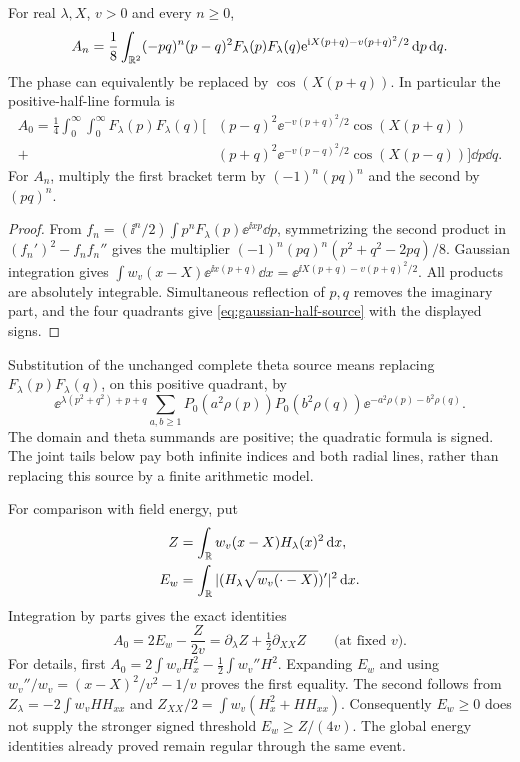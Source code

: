 \begin{proposition}\label{prop:gaussian-source}
For real \(\lambda,X\), \(v>0\) and every \(n\ge0\),
\begin{equation}\label{eq:gaussian-full-source}
 A_n=\frac18\int_{\mathbb R^2}(-pq)^n(p-q)^2F_\lambda(p)F_\lambda(q)
       \mathrm e^{\mathrm i X(p+q)-v(p+q)^2/2}\,\mathrm d p\,\mathrm d q.
\end{equation}
The phase can equivalently be replaced by \(\cos(X(p+q))\).
In particular the positive-half-line formula is
\begin{align}\label{eq:gaussian-half-source}
 A_0=\frac14\int_0^\infty\!\int_0^\infty F_\lambda(p)F_\lambda(q)
 \bigl[&(p-q)^2\ee^{-v(p+q)^2/2}\cos(X(p+q))\nonumber\\
       +&(p+q)^2\ee^{-v(p-q)^2/2}\cos(X(p-q))\bigr]\dd p\dd q.
\end{align}
For \(A_n\), multiply the first bracket term by \((-1)^n(pq)^n\)
and the second by \((pq)^n\).
\end{proposition}
\begin{proof}
From \(f_n=(\ii^n/2)\int p^nF_\lambda(p)\ee^{\ii xp}\dd p\),
symmetrizing the second product in \((f_n')^2-f_nf_n''\) gives
the multiplier \((-1)^n(pq)^n(p^2+q^2-2pq)/8\).
Gaussian integration gives
\(\int w_v(x-X)\ee^{\ii x(p+q)}\dd x
=\ee^{\ii X(p+q)-v(p+q)^2/2}\).
All products are absolutely integrable. Simultaneous reflection of
\(p,q\) removes the imaginary part, and the four quadrants give
\eqref{eq:gaussian-half-source} with the displayed signs.
\end{proof}

Substitution of the unchanged complete theta source means replacing
\(F_\lambda(p)F_\lambda(q)\), on this positive quadrant, by
\begin{equation}\label{eq:gaussian-theta-product}
 \ee^{\lambda(p^2+q^2)+p+q}
 \sum_{a,b\ge1}P_0(a^2\rho(p))P_0(b^2\rho(q))
                    \ee^{-a^2\rho(p)-b^2\rho(q)}.
\end{equation}
The domain and theta summands are positive; the quadratic formula is
signed. The joint tails below pay both infinite indices and both radial
lines, rather than replacing this source by a finite arithmetic model.

For comparison with field energy, put
\[
 \begin{aligned}
 Z&=\int_\mathbb R w_v(x-X)H_\lambda(x)^2\,\mathrm d x,\\
 E_w&=\int_\mathbb R|(H_\lambda\sqrt{w_v(\cdot-X)})'|^2\,\mathrm d x.
 \end{aligned}
\]
Integration by parts gives the exact identities
\begin{equation}\label{eq:gaussian-kinetic}
 A_0=2E_w-\frac{Z}{2v}
       =\partial_\lambda Z+\tfrac12\partial_{XX}Z
       \qquad\text{(at fixed \(v\)).}
\end{equation}
For details, first
\(A_0=2\int w_vH_x^2-\tfrac12\int w_v''H^2\).
Expanding \(E_w\) and using
\(w_v''/w_v=(x-X)^2/v^2-1/v\) proves the first equality.
The second follows from
\(Z_\lambda=-2\int w_vHH_{xx}\) and
\(Z_{XX}/2=\int w_v(H_x^2+HH_{xx})\).
Consequently \(E_w\ge0\) does not supply the stronger signed threshold
\(E_w\ge Z/(4v)\). The global energy identities already proved remain
regular through the same event.

